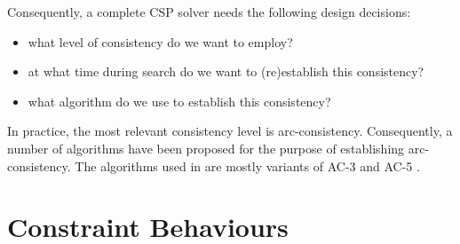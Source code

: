 Consequently, a complete CSP solver needs the following design decisions:
\begin{itemize}
\item what level of consistency do we want to employ?
\item at what time during search do we want to (re)establish this consistency?
\item what algorithm do we use to establish this consistency?
\end{itemize}
In practice, the most relevant consistency level is arc-consistency.
Consequently, a number of algorithms have been proposed for the
purpose of establishing arc-consistency. The algorithms used in \eclipse{}
are mostly variants of AC-3 \cite{mackworth77}
and AC-5 \cite{vanhentenryck92generic}.



\section{Constraint Behaviours}

